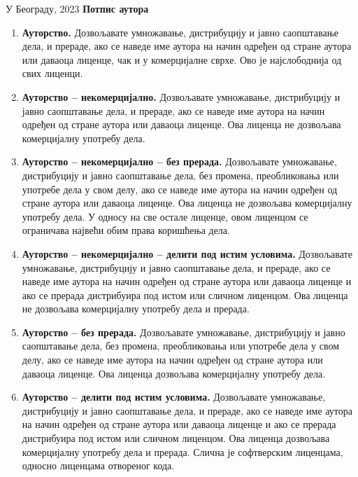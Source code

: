\vfill

 
У Београду, \hspace{1cm} 2023  \hfill  \textbf{Потпис
аутора\hspace{2cm}\mbox{}}

\vspace{.5cm}
\hspace{10cm}\hrulefill 

\hspace{\fill}

\pagebreak
\thispagestyle{empty}


\begin{enumerate}[leftmargin=0.5cm]
\item \textbf{Ауторство.} Дозвољавате умножавање, дистрибуцију и јавно 
саопштавање дела, и 
прераде, ако се наведе име аутора на начин одређен од стране аутора или даваоца 
лиценце, чак и у комерцијалне сврхе. Ово је најслободнија од свих лиценци.
\item \textbf{Ауторство -- некомерцијално.} Дозвољавате умножавање, 
дистрибуцију и јавно 
саопштавање дела, и прераде, ако се наведе име аутора на начин одређен од 
стране 
аутора или даваоца лиценце. Ова лиценца не дозвољава комерцијалну употребу дела.
\item \textbf{Ауторство -- некомерцијално -- без прерада.} Дозвољавате 
умножавање, 
дистрибуцију и јавно саопштавање дела, без промена, преобликовања или употребе 
дела у свом делу, ако се наведе име аутора на начин одређен од стране аутора 
или 
даваоца лиценце. Ова лиценца не дозвољава комерцијалну употребу дела. У односу 
на све остале лиценце, овом лиценцом се ограничава највећи обим права коришћења 
дела. 
\item \textbf{Ауторство -- некомерцијално -- делити под истим условима.} 
Дозвољавате умножавање, дистрибуцију и јавно саопштавање дела, и прераде, ако се 
наведе име 
аутора на начин одређен од стране аутора или даваоца лиценце и ако се прерада 
дистрибуира под истом или сличном лиценцом. Ова лиценца не дозвољава 
комерцијалну употребу дела и прерада.
\item \textbf{Ауторство -- без прерада.} Дозвољавате умножавање, дистрибуцију и 
јавно 
саопштавање дела, без промена, преобликовања или употребе дела у свом делу, ако 
се наведе име аутора на начин одређен од стране аутора или даваоца лиценце. Ова 
лиценца дозвољава комерцијалну употребу дела.
\item \textbf{Ауторство -- делити под истим условима.} Дозвољавате умножавање, 
дистрибуцију и 
јавно саопштавање дела, и прераде, ако се наведе име аутора на начин одређен од 
стране аутора или даваоца лиценце и ако се прерада дистрибуира под истом или 
сличном лиценцом. Ова лиценца дозвољава комерцијалну употребу дела и прерада. 
Слична је софтверским лиценцама, односно лиценцама отвореног кода.               
\end{enumerate}
